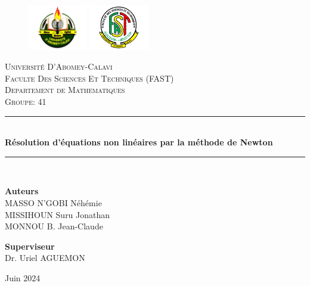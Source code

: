 \documentclass[12pt, openany]{report}
\newcommand{\HRule}{\rule{\linewidth}{0.5mm}}
\begin{document}
\begin{titlepage}
  \begin{sffamily}
  \begin{center}

    \begin{figure}[t]
        \centering
        \includegraphics[height=2cm]{uac.jpg}
        \hspace{10cm} %
        \includegraphics[height=2cm]{FAST.jpg}
    \end{figure}

    \textsc{\LARGE Université D'Abomey-Calavi}\\[1cm]
    \textsc{\LARGE Faculte Des Sciences Et Techniques (FAST)}\\[1cm]
    \textsc{\LARGE Departement de Mathematiques}\\[1cm]

    \textsc{\Large Groupe: 41}\\[1.5cm]

    \HRule \\[0.4cm]
    { \huge \bfseries Résolution d'équations non linéaires par la méthode de Newton\\[0.4cm] }

    \HRule \\[2cm]

    \begin{minipage}{0.4\textwidth}
      \begin{flushleft} \large
         \textbf{Auteurs}\\
         MASSO N'GOBI Néhémie\\
         MISSIHOUN Suru Jonathan\\
         MONNOU B. Jean-Claude\\
      \end{flushleft}
    \end{minipage}
    \begin{minipage}{0.4\textwidth}
      \begin{flushright} \large
        \textbf{Superviseur}\\
        Dr. Uriel AGUEMON
      \end{flushright}
    \end{minipage}

    \vfill

    {\large  Juin 2024}

  \end{center}
  \end{sffamily}
\end{titlepage}
\end{document}
